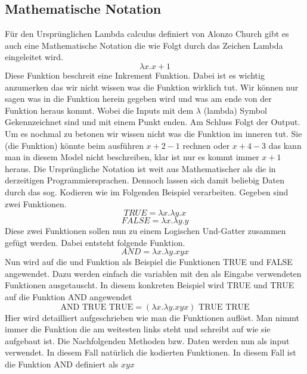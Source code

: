 \subsection{Mathematische Notation}
Für den Ursprünglichen Lambda calculus definiert von Alonzo Church gibt es auch 
eine Mathematische Notation die wie Folgt durch das Zeichen Lambda eingeleitet wird.
\begin{equation}
\lambda x. x + 1
\end{equation}
Diese Funktion beschreit eine Inkrement Funktion. Dabei ist es wichtig anzumerken das wir nicht wissen was die Funktion wirklich tut. Wir können nur sagen was in die Funktion herein gegeben wird und was am ende von der Funktion heraus kommt. Wobei die Inputs mit dem $\lambda$ (lambda) Symbol Gekennzeichnet sind und mit einem Punkt enden. Am Schluss Folgt der Output. Um es nochmal zu betonen wir wissen nicht was die Funktion im inneren tut. Sie (die Funktion) könnte beim ausführen $x + 2 - 1$ rechnen oder $x + 4 - 3$ das kann man in diesem Model nicht beschreiben, klar ist nur es kommt immer $x + 1$ heraus.
Die Ursprüngliche Notation ist weit aus Mathematischer als die in derzeitigen Programmiersprachen. Dennoch lassen sich damit beliebig Daten durch das sog. Kodieren wie im Folgenden Beispiel verarbeiten.
Gegeben sind zwei Funktionen.
\begin{equation}
TRUE = \lambda x. \lambda y. x
\end{equation}
\begin{equation}
FALSE = \lambda x. \lambda y. y
\end{equation}
Diese zwei Funktionen sollen nun zu einem Logischen Und-Gatter zusammen gefügt werden.
Dabei entsteht folgende Funktion.
\begin{equation}
AND = \lambda x. \lambda y. x y x
\end{equation}
Nun wird auf die und Funktion als Beispiel die Funktionen TRUE und FALSE angewendet. Dazu werden einfach die variablen mit den als Eingabe verwendeten Funktionen ausgetauscht. In diesem konkreten Beispiel wird TRUE und TRUE auf die Funktion AND angewendet
\begin{equation}
\text{AND TRUE TRUE} = (\lambda x. \lambda y. x y x) \text{ TRUE TRUE} 
\end{equation}
Hier wird detailliert aufgeschrieben wie man die Funktionen auflöst. Man nimmt immer die Funktion die am weitesten links steht und schreibt auf wie sie aufgebaut ist. Die Nachfolgenden Methoden bzw. Daten werden nun als input verwendet. In diesem Fall natürlich die kodierten Funktionen. In diesem Fall ist die Funktion AND definiert als $x y x$
